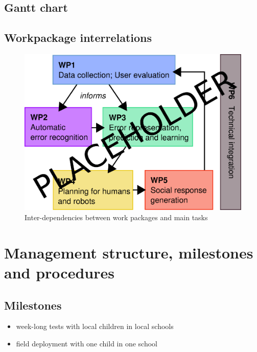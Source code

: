 \documentclass[11pt]{report}
\begin{document}
\subsection{Gantt chart}\label{gantt-chart}

\begin{landscape}

\end{landscape}

\subsection{Workpackage interrelations}\label{workpackage-interrelations}

\begin{figure}[!htbp]
    \centering
    \includegraphics[width=0.8\linewidth]{figs/wp-interrelations}
    \caption{Inter-dependencies between work packages and main tasks}
    \label{}
\end{figure}



\section{Management structure, milestones and procedures}\label{management-structure-milestones-and-procedures}

\subsection{Milestones}\label{milestones}

\begin{itemize}

\item   week-long tests with local children in local schools
\item   field deployment with one child in one school
\end{itemize}
\end{document}
